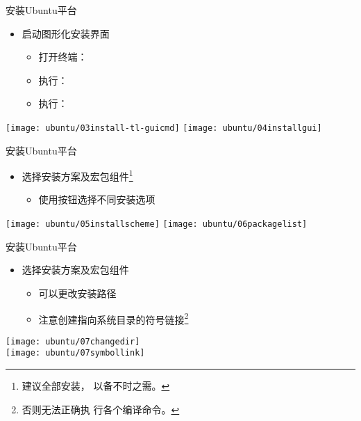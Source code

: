 \documentclass[fontset = none, t]{ctexbeamer}
\begin{document}
\begin{frame}{安装\tl}{Ubuntu平台}
  \begin{spacing}{1.0}
    \begin{itemize}
    \item 启动\tl 图形化安装界面
      \begin{itemize}
      \item 打开终端：\setmenukeyswin {}
      \item 执行：
      \item 执行：
      \end{itemize}
    \end{itemize}
  \begin{center}
    \texttt{[image: ubuntu/03install-tl-guicmd]}
    \texttt{[image: ubuntu/04installgui]}
  \end{center}
  \end{spacing}
\end{frame}

\begin{frame}{安装\tl}{Ubuntu平台}
  \begin{spacing}{1.0}
    \begin{itemize}
    \item 选择\tl 安装方案及宏包组件\footnote[frame,1]{建议全部安装，
        以备不时之需。}
      \begin{itemize}
      \item 使用按钮选择不同安装选项
      \end{itemize}
    \end{itemize}
  \begin{center}
    \texttt{[image: ubuntu/05installscheme]}
    \texttt{[image: ubuntu/06packagelist]}
  \end{center}
  \end{spacing}
\end{frame}

\begin{frame}{安装\tl}{Ubuntu平台}
  \begin{spacing}{1.0}
    \begin{itemize}
    \item 选择\tl 安装方案及宏包组件
      \begin{itemize}
      \item 可以更改安装路径
      \item 注意创建\alert{指向系统目录的符号链接}\footnote[frame,1]{否则无法正确执
        行各个编译命令。}
      \end{itemize}
    \end{itemize}
  \begin{center}
     \texttt{[image: ubuntu/07changedir]}\\  
    \texttt{[image: ubuntu/07symbollink]}
  \end{center}
  \end{spacing}
\end{frame}
\end{document}
